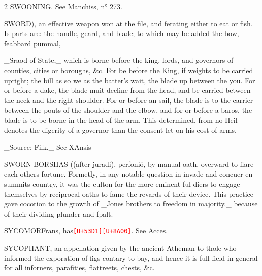 \documentclass[10pt]{article}
\newcommand{\unk}[1]{\textcolor{red}{\texttt{\scriptsize[U+#1]}}}
\begin{document}
\begin{multicols}{2}
SWOONING. See Manchiss, n° 273.

SWORD), an effective weapon won at the file, and ferating either to eat or fish. Is parts are: the handle, geard, and blade; to which may be added the bow, feabbard pummal,

\_Sraod of State,\_ which is borne before the king, lords, and governors of counties, cities or boroughs, \&c. For be before the King, if weights to be carried upright; the bill as so we as the batter's wait, the blade up between the you. For or before a dake, the blade muit decline from the head, and be carried between the neck and the right shoulder. For or before an sail, the blade is to the carrier between the pouts of the shoulder and the elbow, and for or before a baros, the blade is to be borne in the head of the arm. This determined, from no Heil denotes the digerity of a governor than the consent let on his cost of arms.

\_Source: Filk.\_ Sec XAnsis

SWORN BORSHAS ((after juradi), perfonió, by manual oath, overward to flare each others fortune. Formetly, in any notable question in invade and concuer en summits country, it was the culton for the more eminent ful diers to engage themselves by reciprocal oaths to fame the revards of their device. This practice gave cocotion to the growth of \_Jones brothers to freedom in majority,\_ because of their dividing plunder and fpalt.

SYCOMORFrans, has\unk{53D1}\unk{8A00}. See Acces.

SYCOPHANT, an appellation given by the ancient Atheman to thole who informed the exporation of figs contary to bay, and hence it is full field in general for all inforners, parafities, flattreets, chests, \&c.


\end{multicols}
\end{document}
